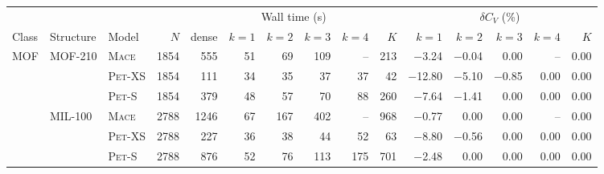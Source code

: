 \begin{tabular}{lllr rrrrrr rrrrr}
\toprule
& & & & \multicolumn{6}{c}{Wall time (\si{\second})} & \multicolumn{5}{c}{$\delta C_V$ (\%)} \\
\cmidrule(lr){5-10} \cmidrule(lr){11-15}
           Class  &         Structure  &             Model  &               $N$  &             dense  &           $k{=}1$  &           $k{=}2$  &           $k{=}3$  &           $k{=}4$  &               $K$  &           $k{=}1$  &           $k{=}2$  &           $k{=}3$  &           $k{=}4$  &               $K$ \\ 
\midrule
             MOF  &           MOF-210  &     \textsc{Mace}  &        \num{1854}  &         \num{555}  &          \num{51}  &          \num{69}  &         \num{109}  &                --  &         \num{213}  &       \num{-3.24}  &       \num{-0.04}  &        \num{0.00}  &                --  &        \num{0.00} \\ 
                  &                    &   \textsc{Pet}-XS  &        \num{1854}  &         \num{111}  &          \num{34}  &          \num{35}  &          \num{37}  &          \num{37}  &          \num{42}  &      \num{-12.80}  &       \num{-5.10}  &       \num{-0.85}  &        \num{0.00}  &        \num{0.00} \\ 
                  &                    &    \textsc{Pet}-S  &        \num{1854}  &         \num{379}  &          \num{48}  &          \num{57}  &          \num{70}  &          \num{88}  &         \num{260}  &       \num{-7.64}  &       \num{-1.41}  &        \num{0.00}  &        \num{0.00}  &        \num{0.00} \\ 
\addlinespace
                  &           MIL-100  &     \textsc{Mace}  &        \num{2788}  &        \num{1246}  &          \num{67}  &         \num{167}  &         \num{402}  &                --  &         \num{968}  &       \num{-0.77}  &        \num{0.00}  &        \num{0.00}  &                --  &        \num{0.00} \\ 
                  &                    &   \textsc{Pet}-XS  &        \num{2788}  &         \num{227}  &          \num{36}  &          \num{38}  &          \num{44}  &          \num{52}  &          \num{63}  &       \num{-8.80}  &       \num{-0.56}  &        \num{0.00}  &        \num{0.00}  &        \num{0.00} \\ 
                  &                    &    \textsc{Pet}-S  &        \num{2788}  &         \num{876}  &          \num{52}  &          \num{76}  &         \num{113}  &         \num{175}  &         \num{701}  &       \num{-2.48}  &        \num{0.00}  &        \num{0.00}  &        \num{0.00}  &        \num{0.00} \\ 

\end{tabular}
